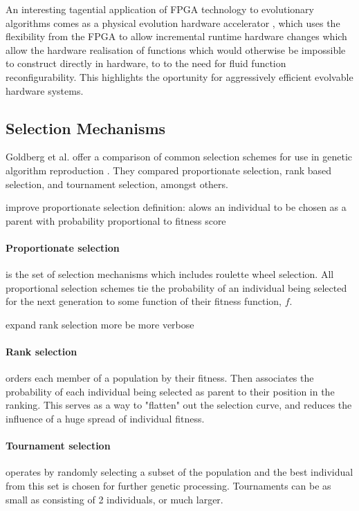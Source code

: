 An interesting tagential application of FPGA technology to evolutionary algorithms comes as
a physical evolution hardware accelerator \cite{1377261}, which uses the flexibility from the
FPGA to allow incremental runtime hardware changes which allow the hardware realisation of
functions which would otherwise be impossible to construct directly in hardware, to to the
need for fluid function reconfigurability.
This highlights the oportunity for aggressively efficient evolvable hardware
systems.

\subsection{Selection Mechanisms}

Goldberg et al. offer a comparison of common selection schemes for use in genetic
algorithm reproduction \cite{GOLDBERG199169}. They compared proportionate
selection, rank based selection, and tournament selection, amongst others.

\todo improve proportionate selection definition: alows an individual to be chosen
as a parent with probability proportional to fitness score

\paragraph{Proportionate selection} is the set of selection mechanisms which includes
roulette wheel selection. All proportional selection schemes tie the probability of
an individual being selected for the next generation to some function of their fitness
function, $f$.

\todo expand rank selection more be more verbose

\paragraph{Rank selection} orders each member of a population by their
fitness. Then associates the probability of each individual being selected as
parent to their position in the ranking. This serves as
a way to "flatten" out the selection curve, and reduces the influence of
a huge spread of individual fitness.

\paragraph{Tournament selection} operates by randomly selecting a subset of the
population and the best individual from this set is chosen for further genetic
processing. Tournaments can be as small as consisting of 2 individuals, or much
larger.

